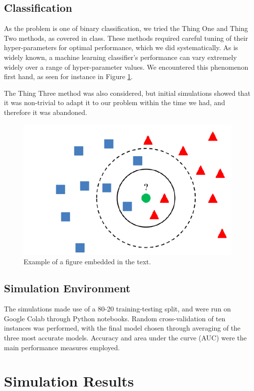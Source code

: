 \documentclass[12pt,a4paper]{article}
\begin{document}
	\subsection{Classification}
	As the problem is one of binary classification, we tried the Thing One and Thing Two methods, as covered in class. These methods required careful tuning of their hyper-parameters for optimal performance, which we did systematically. As is widely known, a machine learning classifier's performance can vary extremely widely over a range of hyper-parameter values. We encountered this phenomenon first hand, as seen for instance in Figure \ref{fig:one}.
	
	The Thing Three method was also considered, but initial simulations showed that it was non-trivial to adapt it to our problem within the time we had, and therefore it was abandoned.
	
	\begin{figure}
	\begin{center}
		\includegraphics[width=0.8\linewidth]{KNN.png}
	\end{center}
	\caption{Example of a figure embedded in the text.}
	\label{fig:one}
	\end{figure}
	
	\subsection{Simulation Environment}
	The simulations made use of a 80-20 training-testing split, and were run on Google Colab through Python notebooks. Random cross-validation of ten instances was performed, with the final model chosen through averaging of the three most accurate models. Accuracy and area under the curve (AUC) were the main performance measures employed.
	
	\section{Simulation Results}\label{sec:findings}
\end{document}
